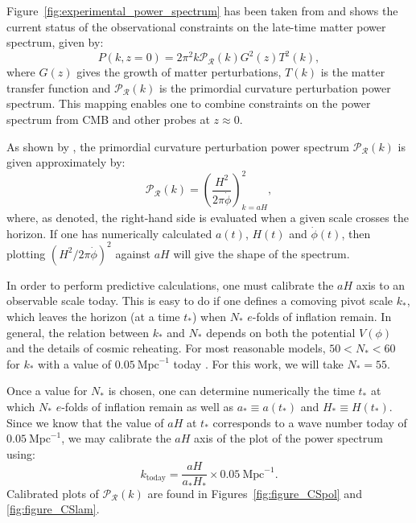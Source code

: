 Figure~\ref{fig:experimental_power_spectrum} has been taken from \citet{hlozek_atacama_2012} and shows the current status of the observational constraints on the late-time matter power spectrum, given by:
%
\begin{equation}
  P(k,z=0) = 2\pi^2 k \mathcal{P}_\mathcal{R}(k) G^2(z) T^2(k),
\end{equation}
%
where $G(z)$ gives the growth of matter perturbations, $T(k)$ is the matter transfer function and $\mathcal{P}_\mathcal{R}(k)$ is the primordial curvature perturbation power spectrum. This mapping enables one to combine constraints on the power spectrum from CMB and other probes at $z\approx 0$.




As shown by \citet{liddle_cosmological_2000}, the primordial curvature perturbation power spectrum $\mathcal{P}_{\mathcal{R}}(k)$ is given approximately by:
%
\begin{equation}
  \mathcal{P}_{\mathcal{R}}(k)
  =
  {\left(\frac{H^2}{2\pi\dot{\phi}}\right)}^2_{k=a H},
  \label{eqn:curvature_power_spectrum}
\end{equation}
%
where, as denoted, the right-hand side is evaluated when a given scale crosses the horizon. If one has numerically calculated $a(t)$, $H(t)$ and $\dot{\phi}(t)$, then plotting ${\left(H^2/ 2\pi\dot{\phi}\right)}^2$ against $aH$ will give the shape of the spectrum.

In order to perform predictive calculations, one must calibrate the $aH$ axis to an observable scale today. This is easy to do if one defines a comoving pivot scale $k_*$, which leaves the horizon (at a time $t_*$) when $N_*$ $e$-folds of inflation remain. In general, the relation between $k_*$ and $N_*$ depends on both the potential $V(\phi)$ and the details of cosmic reheating. For most reasonable models, $50<N_*<60$  for $k_*$ with a value of $0.05\:\mathrm{Mpc}^{-1}$ today \citep{planck_collaboration_planck_2013-1}. For this work, we will take $N_*=55$. 

Once a value for $N_*$ is chosen, one can determine numerically the time $t_*$ at which $N_*$ $e$-folds of inflation remain as well as $a_*\equiv a(t_*)$ and $H_*\equiv H(t_*)$. Since we know that the value of $aH$ at $t_*$ corresponds to a wave number today of $0.05\:\mathrm{Mpc}^{-1}$, we may calibrate the $aH$ axis of the plot of the power spectrum using:
%
\begin{equation}
  k_\mathrm{today} 
  = 
  \frac{aH}{a_*H_*}\times0.05\:\mathrm{Mpc}^{-1}.
\end{equation}
%
Calibrated plots of $\mathcal{P}_\mathcal{R}(k)$ are found in Figures~\ref{fig:figure_CSpol} and \nolinebreak\ref{fig:figure_CSlam}. 


